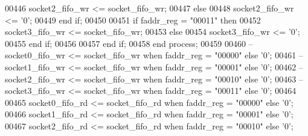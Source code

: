 \begin{DoxyCode}
00446          \textcolor{vhdlchar}{socket2_fifo_wr}    \textcolor{vhdlchar}{<=} \textcolor{vhdlchar}{socket_fifo_wr};
00447       \textcolor{keywordflow}{else} 
00448          \textcolor{vhdlchar}{socket2_fifo_wr}    \textcolor{vhdlchar}{<=} \textcolor{vhdlchar}{'}\textcolor{vhdllogic}{}\textcolor{vhdllogic}{0}\textcolor{vhdlchar}{'};
00449       \textcolor{keywordflow}{end} \textcolor{keywordflow}{if};
00450 
00451       \textcolor{keywordflow}{if} \textcolor{vhdlchar}{faddr_reg} \textcolor{vhdlchar}{=} \textcolor{vhdllogic}{"00011"} \textcolor{keywordflow}{then} 
00452          \textcolor{vhdlchar}{socket3_fifo_wr}    \textcolor{vhdlchar}{<=} \textcolor{vhdlchar}{socket_fifo_wr};
00453       \textcolor{keywordflow}{else} 
00454          \textcolor{vhdlchar}{socket3_fifo_wr}    \textcolor{vhdlchar}{<=} \textcolor{vhdlchar}{'}\textcolor{vhdllogic}{}\textcolor{vhdllogic}{0}\textcolor{vhdlchar}{'};
00455       \textcolor{keywordflow}{end} \textcolor{keywordflow}{if};
00456 
00457     \textcolor{keywordflow}{end} \textcolor{keywordflow}{if}; 
00458 \textcolor{keywordflow}{end} \textcolor{keywordflow}{process};
00459 
00460 \textcolor{keyword}{--socket0\_fifo\_wr   <= socket\_fifo\_wr when faddr\_reg = "00000" else '0';}
00461 \textcolor{keyword}{--socket1\_fifo\_wr   <= socket\_fifo\_wr when faddr\_reg = "00001" else '0';}
00462 \textcolor{keyword}{--socket2\_fifo\_wr   <= socket\_fifo\_wr when faddr\_reg = "00010" else '0';}
00463 \textcolor{keyword}{--socket3\_fifo\_wr   <= socket\_fifo\_wr when faddr\_reg = "00011" else '0';}
00464 
00465 \textcolor{vhdlchar}{socket0_fifo_rd} \textcolor{vhdlchar}{<=} \textcolor{vhdlchar}{socket_fifo_rd} \textcolor{keywordflow}{when} \textcolor{vhdlchar}{faddr_reg} \textcolor{vhdlchar}{=} \textcolor{vhdllogic}{"00000"} \textcolor{keywordflow}{else} \textcolor{vhdlchar}{'}\textcolor{vhdllogic}{}\textcolor{vhdllogic}{0}\textcolor{vhdlchar}{'};
00466 \textcolor{vhdlchar}{socket1_fifo_rd} \textcolor{vhdlchar}{<=} \textcolor{vhdlchar}{socket_fifo_rd} \textcolor{keywordflow}{when} \textcolor{vhdlchar}{faddr_reg} \textcolor{vhdlchar}{=} \textcolor{vhdllogic}{"00001"} \textcolor{keywordflow}{else} \textcolor{vhdlchar}{'}\textcolor{vhdllogic}{}\textcolor{vhdllogic}{0}\textcolor{vhdlchar}{'};
00467 \textcolor{vhdlchar}{socket2_fifo_rd} \textcolor{vhdlchar}{<=} \textcolor{vhdlchar}{socket_fifo_rd} \textcolor{keywordflow}{when} \textcolor{vhdlchar}{faddr_reg} \textcolor{vhdlchar}{=} \textcolor{vhdllogic}{"00010"} \textcolor{keywordflow}{else} \textcolor{vhdlchar}{'}\textcolor{vhdllogic}{}\textcolor{vhdllogic}{0}\textcolor{vhdlchar}{'};

\end{DoxyCode}
